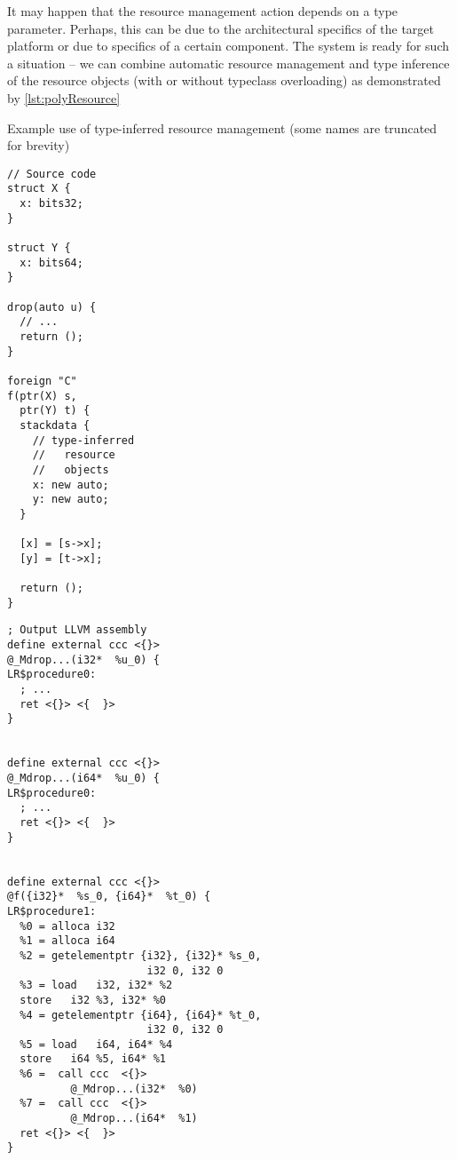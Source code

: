 It may happen that the resource management action depends on a type parameter. Perhaps, this can be due to the architectural specifics of the target platform or due to specifics of a certain component. The system is ready for such a situation -- we can combine automatic resource management and type inference of the resource objects (with or without typeclass overloading) as demonstrated by \cref{lst:polyResource}

\begin{codex}
    \small
    \caption{Example use of type-inferred resource management (some names are truncated for brevity)}
    \label{lst:polyResource}
    \begin{center}
    \begin{minipage}{0.35\linewidth}
    \begin{lstlisting}
// Source code
struct X {
  x: bits32;
}

struct Y {
  x: bits64;
}

drop(auto u) {
  // ...
  return ();
}

foreign "C"
f(ptr(X) s,
  ptr(Y) t) {
  stackdata {
    // type-inferred
    //   resource
    //   objects
    x: new auto;
    y: new auto;
  }

  [x] = [s->x];
  [y] = [t->x];

  return ();
}
    \end{lstlisting}
    \end{minipage}%
    \begin{minipage}{0.65\linewidth}
    \begin{lstlisting}[style=llvmStyle]
; Output LLVM assembly
define external ccc <{}>
@_Mdrop...(i32*  %u_0) {
LR$procedure0:
  ; ...
  ret <{}> <{  }>
}


define external ccc <{}>
@_Mdrop...(i64*  %u_0) {
LR$procedure0:
  ; ...
  ret <{}> <{  }>
}


define external ccc <{}>
@f({i32}*  %s_0, {i64}*  %t_0) {
LR$procedure1:
  %0 = alloca i32
  %1 = alloca i64
  %2 = getelementptr {i32}, {i32}* %s_0,
                      i32 0, i32 0
  %3 = load   i32, i32* %2
  store   i32 %3, i32* %0
  %4 = getelementptr {i64}, {i64}* %t_0,
                      i32 0, i32 0
  %5 = load   i64, i64* %4
  store   i64 %5, i64* %1
  %6 =  call ccc  <{}>
          @_Mdrop...(i32*  %0)
  %7 =  call ccc  <{}>
          @_Mdrop...(i64*  %1)
  ret <{}> <{  }>
}
    \end{lstlisting}
    \end{minipage}
    \end{center}
\end{codex}


